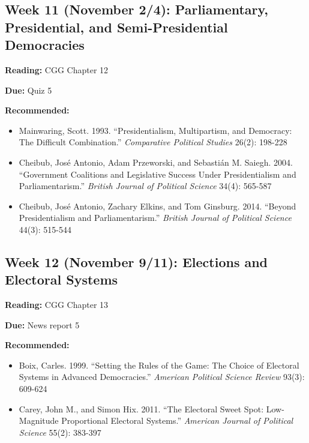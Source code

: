 \documentclass[
  11pt,
]{article}
\providecommand{\tightlist}{%
  \setlength{\itemsep}{0pt}\setlength{\parskip}{0pt}}
\begin{document}
\hypertarget{week-11-november-24-parliamentary-presidential-and-semi-presidential-democracies}{%
\subsection{Week 11 (November 2/4): Parliamentary, Presidential, and
Semi-Presidential
Democracies}\label{week-11-november-24-parliamentary-presidential-and-semi-presidential-democracies}}

\textbf{Reading:} CGG Chapter 12

\textbf{Due:} Quiz 5

\textbf{Recommended:}

\begin{itemize}
\tightlist
\item
  Mainwaring, Scott. 1993. ``Presidentialism, Multipartism, and
  Democracy: The Difficult Combination.'' \emph{Comparative Political
  Studies} 26(2): 198-228
\item
  Cheibub, José Antonio, Adam Przeworski, and Sebastián M. Saiegh. 2004.
  ``Government Coalitions and Legislative Success Under Presidentialism
  and Parliamentarism.'' \emph{British Journal of Political Science}
  34(4): 565-587
\item
  Cheibub, José Antonio, Zachary Elkins, and Tom Ginsburg. 2014.
  ``Beyond Presidentialism and Parliamentarism.'' \emph{British Journal
  of Political Science} 44(3): 515-544
\end{itemize}

\hypertarget{week-12-november-911-elections-and-electoral-systems}{%
\subsection{Week 12 (November 9/11): Elections and Electoral
Systems}\label{week-12-november-911-elections-and-electoral-systems}}

\textbf{Reading:} CGG Chapter 13

\textbf{Due:} News report 5

\textbf{Recommended:}

\begin{itemize}
\tightlist
\item
  Boix, Carles. 1999. ``Setting the Rules of the Game: The Choice of
  Electoral Systems in Advanced Democracies.'' \emph{American Political
  Science Review} 93(3): 609-624
\item
  Carey, John M., and Simon Hix. 2011. ``The Electoral Sweet Spot:
  Low-Magnitude Proportional Electoral Systems.'' \emph{American Journal
  of Political Science} 55(2): 383-397
\end{itemize}
\end{document}
